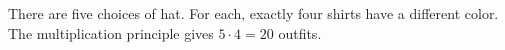 There are five choices of hat. For each, exactly four shirts have a different color. The multiplication principle gives $5\cdot4=\boxed{20}$ outfits.
